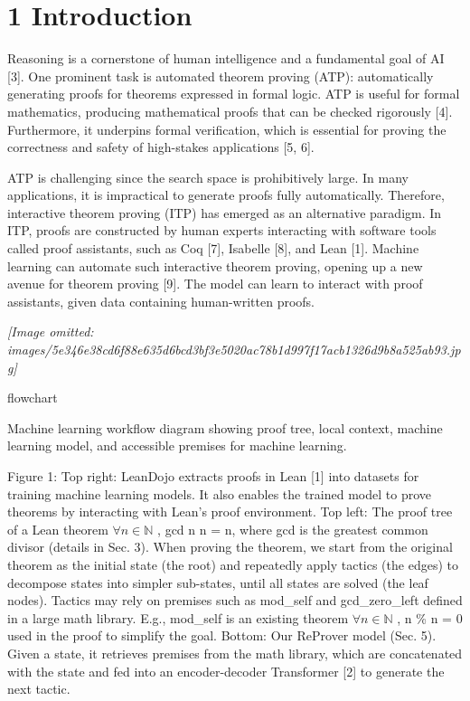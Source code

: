 \documentclass[
]{article}
\begin{document}
\section{1 Introduction}\label{introduction}

Reasoning is a cornerstone of human intelligence and a fundamental goal
of AI {[}3{]}. One prominent task is automated theorem proving (ATP):
automatically generating proofs for theorems expressed in formal logic.
ATP is useful for formal mathematics, producing mathematical proofs that
can be checked rigorously {[}4{]}. Furthermore, it underpins formal
verification, which is essential for proving the correctness and safety
of high-stakes applications {[}5, 6{]}.

ATP is challenging since the search space is prohibitively large. In
many applications, it is impractical to generate proofs fully
automatically. Therefore, interactive theorem proving (ITP) has emerged
as an alternative paradigm. In ITP, proofs are constructed by human
experts interacting with software tools called proof assistants, such as
Coq {[}7{]}, Isabelle {[}8{]}, and Lean {[}1{]}. Machine learning can
automate such interactive theorem proving, opening up a new avenue for
theorem proving {[}9{]}. The model can learn to interact with proof
assistants, given data containing human-written proofs.

\textit{[Image omitted: images/5e346e38cd6f88e635d6bcd3bf3e5020ac78b1d997f17acb1326d9b8a525ab93.jpg]}

flowchart

Machine learning workflow diagram showing proof tree, local context,
machine learning model, and accessible premises for machine learning.

Figure 1: Top right: LeanDojo extracts proofs in Lean {[}1{]} into
datasets for training machine learning models. It also enables the
trained model to prove theorems by interacting with Lean's proof
environment. Top left: The proof tree of a Lean theorem
\(\forall n \in \mathbb{N}\) , gcd n n = n, where gcd is the greatest
common divisor (details in Sec. 3). When proving the theorem, we start
from the original theorem as the initial state (the root) and repeatedly
apply tactics (the edges) to decompose states into simpler sub-states,
until all states are solved (the leaf nodes). Tactics may rely on
premises such as mod\_self and gcd\_zero\_left defined in a large math
library. E.g., mod\_self is an existing theorem
\(\forall n \in \mathbb{N}\) , n \% n = 0 used in the proof to simplify
the goal. Bottom: Our ReProver model (Sec. 5). Given a state, it
retrieves premises from the math library, which are concatenated with
the state and fed into an encoder-decoder Transformer {[}2{]} to
generate the next tactic.
\end{document}
